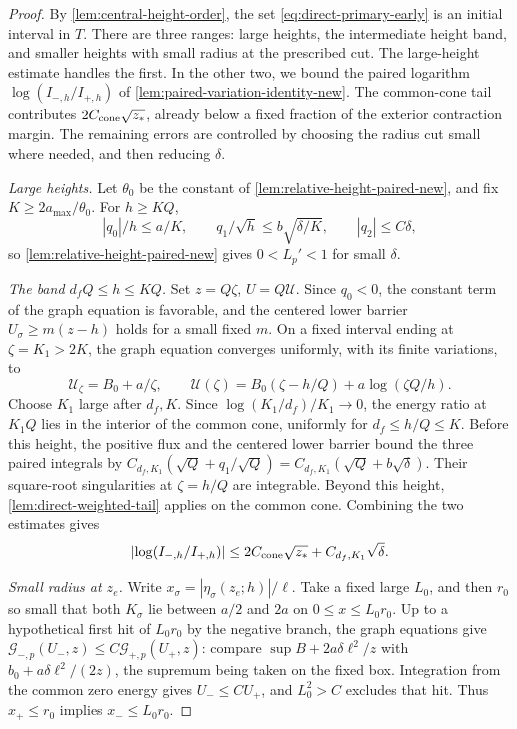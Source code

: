 \begin{proof}
By \cref{lem:central-height-order}, the set
\eqref{eq:direct-primary-early} is an initial interval in \(T\).
There are three ranges: large heights, the intermediate height band,
and smaller heights with small radius at the prescribed cut.
The large-height estimate handles the first. In the other two, we bound the paired
logarithm \(\log(I_{-,h}/I_{+,h})\) of
\cref{lem:paired-variation-identity-new}. The common-cone tail
contributes \(2C_{\rm cone}\sqrt{z_*}\), already below a fixed
fraction of the exterior contraction margin. The remaining errors are
controlled by choosing the radius cut small where needed, and then
reducing \(\delta\).

\emph{Large heights.} Let \(\theta_0\) be the constant of
\cref{lem:relative-height-paired-new}, and fix \(K\ge2a_{\max}/\theta_0\).
For \(h\ge KQ\),
\[
 |q_0|/h\le a/K,\qquad q_1/\sqrt h\le b\sqrt{\delta/K},\qquad
 |q_2|\le C\delta,
\]
so \cref{lem:relative-height-paired-new} gives
\(0<L_p'<1\) for small \(\delta\).

\emph{The band \(d_fQ\le h\le KQ\).} Set \(z=Q\zeta\), \(U=Q\mathcal U\).
Since \(q_0<0\), the constant term of the graph equation is
favorable, and the centered lower barrier \(U_\sigma\ge m(z-h)\) holds
for a small fixed \(m\). On a fixed interval ending at
\(\zeta=K_1>2K\), the graph equation converges uniformly, with its
finite variations, to
\[
 \mathcal U_\zeta=B_0+a/\zeta,\qquad
 \mathcal U(\zeta)=B_0(\zeta-h/Q)+a\log(\zeta Q/h).
\]
Choose \(K_1\) large after \(d_f,K\). Since
\(\log(K_1/d_f)/K_1\to0\), the energy ratio at \(K_1Q\) lies in the
interior of the common cone, uniformly for \(d_f\le h/Q\le K\).
Before this height, the positive flux and the centered lower barrier
bound the three paired integrals by
\(C_{d_f,K_1}(\sqrt Q+q_1/\sqrt Q)=C_{d_f,K_1}(\sqrt Q+b\sqrt\delta)\).
Their square-root singularities at \(\zeta=h/Q\) are integrable.
Beyond this height, \cref{lem:direct-weighted-tail} applies on the
common cone. Combining the two estimates gives
\begin{equation}
\label{eq:direct-primary-early-uniform-section}
 \left|\log(I_{-,h}/I_{+,h})\right|
 \le 2C_{\rm cone}\sqrt{z_*}+C_{d_f,K_1}\sqrt\delta .
\end{equation}

\emph{Small radius at \(z_e\).} Write
\(x_\sigma=|\eta_\sigma(z_e;h)|/\ell\). Take a fixed large \(L_0\), and
then \(r_0\) so small that both \(K_\sigma\) lie between \(a/2\) and
\(2a\) on \(0\le x\le L_0r_0\). Up to a hypothetical first hit
of \(L_0r_0\) by the negative branch, the graph equations give
\(\mathcal G_{-,p}(U_-,z)\le C\mathcal G_{+,p}(U_+,z)\): compare
\(\sup B+2a\delta\ell^2/z\) with \(b_0+a\delta\ell^2/(2z)\), the
supremum being taken on the fixed box. Integration from the common zero
energy gives \(U_-\le CU_+\), and \(L_0^2>C\) excludes that hit.
Thus \(x_+\le r_0\) implies \(x_-\le L_0r_0\).


\end{proof}
